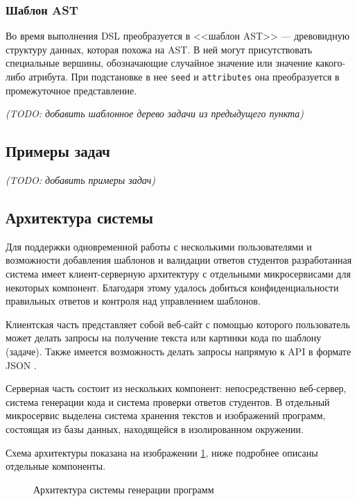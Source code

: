 \subsubsection{Шаблон AST}
Во время выполнения DSL преобразуется в <<шаблон AST>> --- древовидную структуру данных, которая похожа
на AST. В ней могут присутствовать специальные вершины, обозначающие случайное значение или значение
какого-либо атрибута.
При подстановке в нее \texttt{seed} и \texttt{attributes} она преобразуется в промежуточное представление.

\textit{(TODO: добавить шаблонное дерево задачи из предыдущего пункта)}
\subsection{Примеры задач}
\textit{(TODO: добавить примеры задач)}
\subsection{Архитектура системы}
Для поддержки одновременной работы с несколькими пользователями и возможности
добавления шаблонов и валидации ответов студентов разработанная система имеет
клиент-серверную архитектуру с отдельными микросервисами для
некоторых компонент. Благодаря этому удалось добиться конфиденциальности правильных
ответов и контроля над управлением шаблонов.

Клиентская часть представляет собой веб-сайт с помощью которого пользователь может делать
запросы на получение текста или картинки кода по шаблону (задаче). Также имеется возможность
делать запросы напрямую к API в формате JSON \cite{json}.

Серверная часть состоит из нескольких компонент: непосредственно веб-сервер, система генерации
кода и система проверки ответов студентов. В отдельный микросервис выделена система хранения
текстов и изображений программ, состоящая из базы данных, находящейся в изолированном окружении.

Схема архитектуры показана на изображении \ref{architecture}, ниже подробнее описаны отдельные
компоненты.

\begin{figure}[ht]
    \begin{center}
        \scalebox{0.8}{
            
        }
        \caption{\label{architecture} Архитектура системы генерации программ}
    \end{center}
\end{figure}
\clearpage

